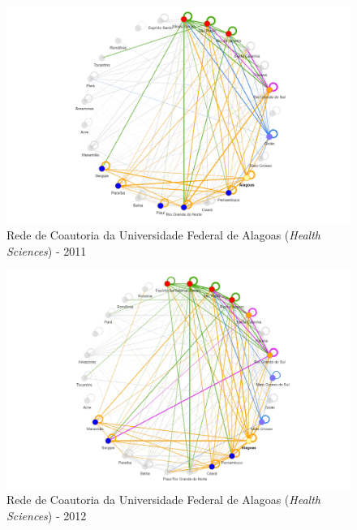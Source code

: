 \begin{figure}[H]
	\centering
	\includegraphics[scale=0.6]{Imagens/rede-al-2011.pdf}
	\caption{Rede de Coautoria da Universidade Federal de Alagoas (\textit{Health Sciences}) - 2011}
	\label{Rede de Coautoria - UF AL 2011}
\end{figure}


\begin{figure}[H]
	\centering
	\includegraphics[scale=0.6]{Imagens/rede-al-2012.pdf}
	\caption{Rede de Coautoria da Universidade Federal de Alagoas (\textit{Health Sciences}) - 2012}
	\label{Rede de Coautoria - UF AL 2012}
\end{figure}

